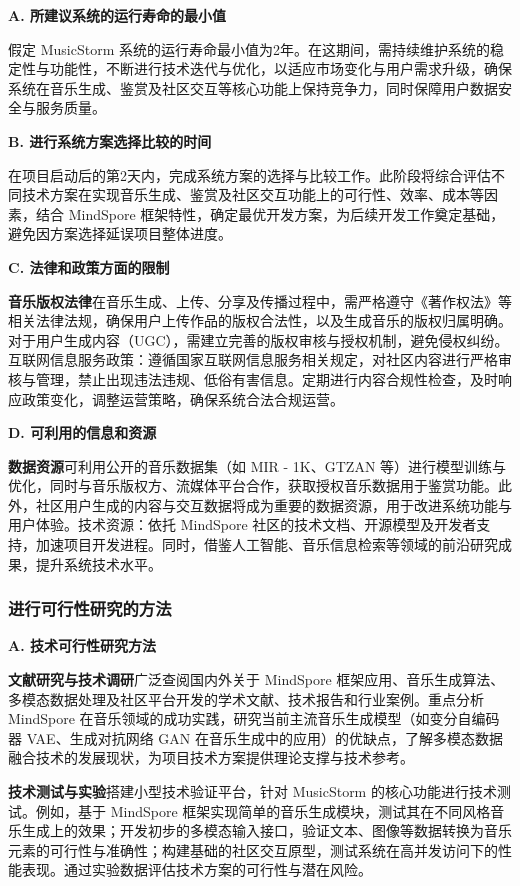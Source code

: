 \documentclass{base}
\begin{document}
\textbf{A. 所建议系统的运行寿命的最小值​}

假定 MusicStorm 系统的运行寿命最小值为2年。在这期间，需持续维护系统的稳定性与功能性，不断进行技术迭代与优化，以适应市场变化与用户需求升级，确保系统在音乐生成、鉴赏及社区交互等核心功能上保持竞争力，同时保障用户数据安全与服务质量。

\textbf{B. 进行系统方案选择比较的时间​}

在项目启动后的第2天内，完成系统方案的选择与比较工作。此阶段将综合评估不同技术方案在实现音乐生成、鉴赏及社区交互功能上的可行性、效率、成本等因素，结合 MindSpore 框架特性，确定最优开发方案，为后续开发工作奠定基础，避免因方案选择延误项目整体进度。

\textbf{C. 法律和政策方面的限制​}

\textbf{音乐版权法律}\quad 在音乐生成、上传、分享及传播过程中，需严格遵守《著作权法》等相关法律法规，确保用户上传作品的版权合法性，以及生成音乐的版权归属明确。对于用户生成内容（UGC），需建立完善的版权审核与授权机制，避免侵权纠纷。​
互联网信息服务政策：遵循国家互联网信息服务相关规定，对社区内容进行严格审核与管理，禁止出现违法违规、低俗有害信息。定期进行内容合规性检查，及时响应政策变化，调整运营策略，确保系统合法合规运营。

\textbf{D. 可利用的信息和资源​}

\textbf{数据资源}\quad 可利用公开的音乐数据集（如 MIR - 1K、GTZAN 等）进行模型训练与优化，同时与音乐版权方、流媒体平台合作，获取授权音乐数据用于鉴赏功能。此外，社区用户生成的内容与交互数据将成为重要的数据资源，用于改进系统功能与用户体验。​
技术资源：依托 MindSpore 社区的技术文档、开源模型及开发者支持，加速项目开发进程。同时，借鉴人工智能、音乐信息检索等领域的前沿研究成果，提升系统技术水平。

\subsubsection{进行可行性研究的方法}

\textbf{A. 技术可行性研究方法​}

\textbf{文献研究与技术调研}\quad 广泛查阅国内外关于 MindSpore 框架应用、音乐生成算法、多模态数据处理及社区平台开发的学术文献、技术报告和行业案例。重点分析 MindSpore 在音乐领域的成功实践，研究当前主流音乐生成模型（如变分自编码器 VAE、生成对抗网络 GAN 在音乐生成中的应用）的优缺点，了解多模态数据融合技术的发展现状，为项目技术方案提供理论支撑与技术参考。​

\textbf{技术测试与实验}\quad 搭建小型技术验证平台，针对 MusicStorm 的核心功能进行技术测试。例如，基于 MindSpore 框架实现简单的音乐生成模块，测试其在不同风格音乐生成上的效果；开发初步的多模态输入接口，验证文本、图像等数据转换为音乐元素的可行性与准确性；构建基础的社区交互原型，测试系统在高并发访问下的性能表现。通过实验数据评估技术方案的可行性与潜在风险。
\end{document}
